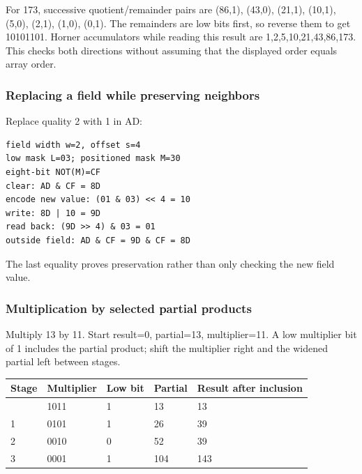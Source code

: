 \hypertarget{appendix-92ff77d4dfdc-decimal-to-binary-and-back}{}

For 173, successive quotient/remainder pairs are (86,1), (43,0), (21,1), (10,1), (5,0), (2,1), (1,0), (0,1). The remainders are low bits first, so reverse them to get 10101101. Horner accumulators while reading this result are 1,2,5,10,21,43,86,173. This checks both directions without assuming that the displayed order equals array order.

\subsubsection{Replacing a field while preserving neighbors}\label{appendix-92ff77d4dfdc-replacing-a-field-while-preserving-neighbors}

\hypertarget{appendix-92ff77d4dfdc-replacing-a-field-while-preserving-neighbors}{}

Replace quality 2 with 1 in AD:

\begin{verbatim}
field width w=2, offset s=4
low mask L=03; positioned mask M=30
eight-bit NOT(M)=CF
clear: AD & CF = 8D
encode new value: (01 & 03) << 4 = 10
write: 8D | 10 = 9D
read back: (9D >> 4) & 03 = 01
outside field: AD & CF = 9D & CF = 8D
\end{verbatim}

The last equality proves preservation rather than only checking the new field value.

\subsubsection{Multiplication by selected partial products}\label{appendix-92ff77d4dfdc-multiplication-by-selected-partial-products}

\hypertarget{appendix-92ff77d4dfdc-multiplication-by-selected-partial-products}{}

Multiply 13 by 11. Start result=0, partial=13, multiplier=11. A low multiplier bit of 1 includes the partial product; shift the multiplier right and the widened partial left between stages.

{\def\LTcaptype{none} %
\begin{longtable}[]{@{}lllll@{}}
\toprule\noalign{}
Stage & Multiplier & Low bit & Partial & Result after inclusion \\
\midrule\noalign{}
\endhead
\bottomrule\noalign{}
\endlastfoot
0 & 1011 & 1 & 13 & 13 \\
1 & 0101 & 1 & 26 & 39 \\
2 & 0010 & 0 & 52 & 39 \\
3 & 0001 & 1 & 104 & 143 \\
\end{longtable}
}

